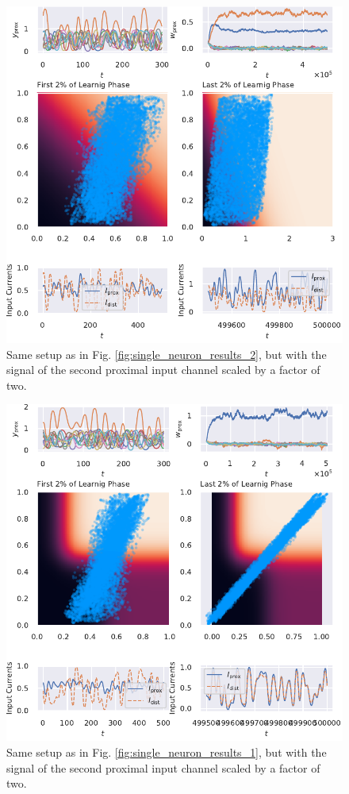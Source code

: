 \documentclass[10pt,a4paper,draft]{article}
\begin{document}
\begin{figure}
\centering
\includegraphics[width=\textwidth]{./figures/fig3.pdf}
\caption{Same setup as in Fig. \ref{fig:single_neuron_results_2}, but with the signal of the second proximal input channel scaled by a factor of two.}
\label{fig:single_neuron_results_3}
\end{figure}

\begin{figure}
\centering
\includegraphics[width=\textwidth]{./figures/fig4.pdf}
\caption{Same setup as in Fig. \ref{fig:single_neuron_results_1}, but with the signal of the second proximal input channel scaled by a factor of two.}
\label{fig:single_neuron_results_4}
\end{figure}
\end{document}
